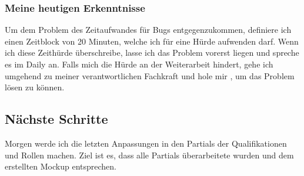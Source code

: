 \subsubsection*{Meine heutigen Erkenntnisse}
Um dem Problem des Zeitaufwandes für Bugs entgegenzukommen, definiere ich einen Zeitblock von 20 Minuten, welche ich für eine Hürde aufwenden darf. 
Wenn ich diese Zeithürde überschreibe, lasse ich das Problem vorerst liegen und spreche es im Daily an. Falls mich die Hürde an der Weiterarbeit hindert, 
gehe ich umgehend zu meiner verantwortlichen Fachkraft und hole mir , um das Problem lösen zu können.

\subsection*{Nächste Schritte}
Morgen werde ich die letzten Anpassungen in den Partials der Qualifikationen und Rollen machen. Ziel ist es, dass
alle Partials überarbeitete wurden und dem erstellten Mockup entsprechen.

\pagebreak
